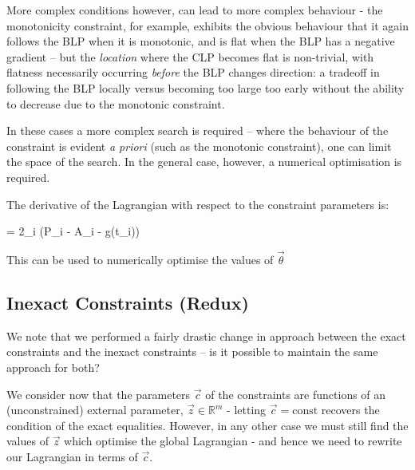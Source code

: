\documentclass[]{article}
\begin{document}
			More complex conditions however, can lead to more complex behaviour - the monotonicity constraint, for example, exhibits the obvious behaviour that it again follows the BLP when it is monotonic, and is flat when the BLP has a negative gradient -- but the \textit{location} where the CLP becomes flat is non-trivial, with flatness necessarily occurring \textit{before} the BLP changes direction: a tradeoff in following the BLP locally versus becoming too large too early without the ability to decrease due to the monotonic constraint.

			In these cases a more complex search is required -- where the behaviour of the constraint is evident \textit{a priori} (such as the monotonic constraint), one can limit the space of the search. In the general case, however, a numerical optimisation is required. 

			The derivative of the Lagrangian with respect to the constraint parameters is:
			\begin{spalign}
				 = 2\sum_i \left(P_i - A_i - g(t_i)\right) 
			\end{spalign}
			This can be used to numerically optimise the values of $\vec{\theta}$

		\subsection{Inexact Constraints (Redux)}
			
			We note that we performed a fairly drastic change in approach between the exact constraints and the inexact constraints -- is it possible to maintain the same approach for both?

			We consider now that the parameters $\vec{c}$ of the constraints are functions of an (unconstrained) external parameter, $\vec{z} \in \mathbb{R}^m$ - letting $\vec{c} = \text{const}$ recovers the condition of the exact equalities. However, in any  other case we must still find the values of $\vec{z}$ which optimise the global Lagrangian - and hence we need to rewrite our Lagrangian in terms of $\vec{c}$.
\end{document}
